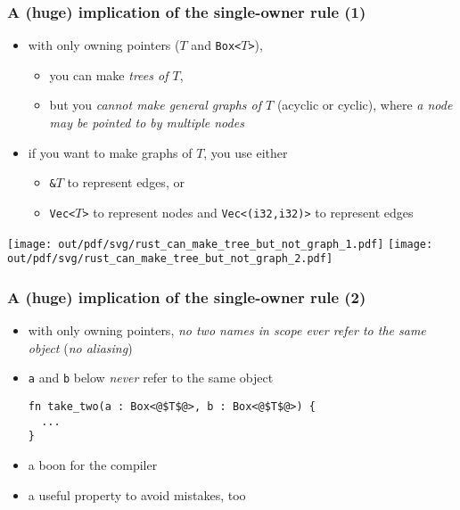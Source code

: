 \documentclass[12pt,dvipdfmx]{beamer}
\newcommand{\ao}[1]{{\color{blue}#1}}
\newcommand{\aka}[1]{{\color{red}#1}}
\begin{document}
\begin{frame}
  \frametitle{A (huge) implication of the single-owner rule (1)}
  \begin{itemize}
  \item with only owning pointers ($T$ and {\tt Box<$T$>}), 
    \begin{itemize}
    \item you can make \ao{\it trees of $T$}, 
    \item but you \aka{\it cannot make general graphs of $T$}
      (acyclic or cyclic),
      where {\it a node may be pointed to by multiple nodes}
    \end{itemize}
  \item if you want to make graphs of $T$, you use either 
    \begin{itemize}
    \item {\tt \&$T$} to represent edges, or
    \item {\tt Vec<$T$>} to represent nodes and {\tt Vec<(i32,i32)>}
      to represent edges
    \end{itemize}
  \end{itemize}

  \begin{center}
\texttt{[image: out/pdf/svg/rust\_can\_make\_tree\_but\_not\_graph\_1.pdf]}
\texttt{[image: out/pdf/svg/rust\_can\_make\_tree\_but\_not\_graph\_2.pdf]}
  \end{center}
  \end{frame}

\begin{frame}[fragile]
  \frametitle{A (huge) implication of the single-owner rule (2)}
  \begin{itemize}
  \item with only owning pointers, {\it no two names in scope
      ever refer to the same object} ({\it no aliasing})
    
  \item {\tt a} and {\tt b} below {\it never} refer to the same object
    \begin{lstlisting}
fn take_two(a : Box<@$T$@>, b : Box<@$T$@>) {
  ...
}        
\end{lstlisting}

\item a boon for the compiler
\item a useful property to avoid mistakes, too
\end{itemize}
\end{frame}
\end{document}

